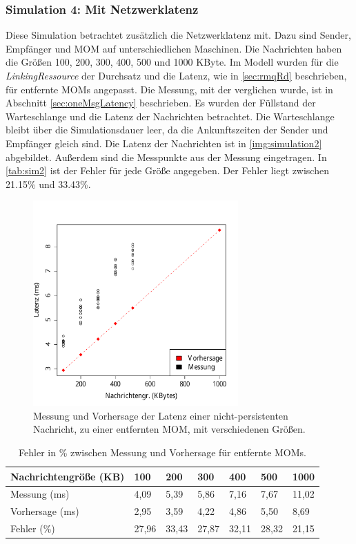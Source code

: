 \subsubsection{Simulation 4: Mit Netzwerklatenz} 
Diese Simulation betrachtet zusätzlich die Netzwerklatenz mit. Dazu sind Sender, Empfänger und MOM auf unterschiedlichen Maschinen. Die Nachrichten haben die Größen 100, 200, 300, 400, 500 und 1000 KByte. Im Modell wurden für die \emph{LinkingRessource} der Durchsatz und die Latenz, wie in \autoref{sec:rmqRd} beschrieben, für entfernte MOMs angepasst. Die Messung, mit der verglichen wurde, ist in Abschnitt \ref{sec:oneMsgLatency} beschrieben. Es wurden der Füllstand der Warteschlange und die Latenz der Nachrichten betrachtet. 
Die Warteschlange bleibt über die Simulationsdauer leer, da die Ankunftszeiten der Sender und Empfänger gleich sind. Die Latenz der Nachrichten ist in \autoref{img:simulation2} abgebildet. Außerdem sind die Messpunkte aus der Messung eingetragen. In \autoref{tab:sim2} ist der Fehler für jede Größe angegeben. Der Fehler liegt zwischen 21.15\% und 33.43\%.
\begin{figure}[t]
\center
  \includegraphics[width=0.7\textwidth]{images/modelSimulationResults/simulation2.pdf}
  \caption{Messung und Vorhersage der Latenz einer nicht-persistenten Nachricht, zu einer entfernten MOM, mit verschiedenen Größen.}
  \label{img:simulation2}
\end{figure}

\begin{table}[t]
\centering
  \begin{tabular}{| l | l | l | l |l | l | l |}
    \hline
    Nachrichtengröße (KB) & 100 & 200 & 300 & 400 & 500 & 1000 \\ \hline
    Messung (ms) & 4,09 & 5,39 & 5,86 & 7,16 & 7,67 & 11,02\\ \hline
    Vorhersage (ms) & 2,95 & 3,59 & 4,22 & 4,86 & 5,50 & 8,69\\ \hline
    Fehler (\%) & 27,96 & 33,43 & 27,87 & 32,11 & 28,32 & 21,15\\ \hline
    
    \hline
      \end{tabular}
	\caption{\label{tab:sim2} Fehler in \% zwischen Messung und Vorhersage für entfernte MOMs.}
\end{table}


